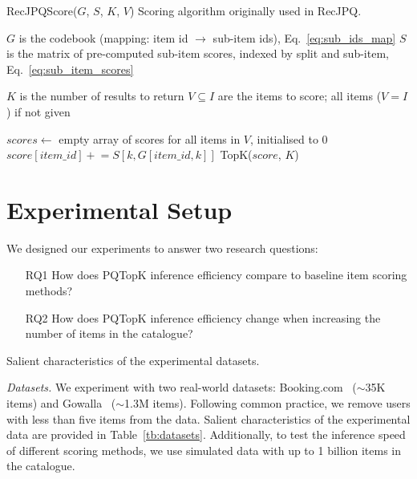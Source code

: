 \documentclass[sigconf,natbib=true, review=False]{acmart} %
\newcommand{\pluseq}{\mathrel{+}=}
\newcommand{\scrc}[1]{\textcolor[HTML]{000000}{#1}}
\begin{document}
\begin{algorithm}[h]
\small
\caption{RecJPQScore($G$, $S$, $K$, $V$) Scoring algorithm \scrc{originally} used in RecJPQ.}\label{alg:RecJPQtop_k}
\begin{algorithmic}[1]
   \Require $G$ is the codebook (mapping: item id $\rightarrow$ sub-item ids), Eq.~\eqref{eq:sub_ids_map}
   \Require $S$ is the matrix of pre-computed sub-item scores, indexed by split and sub-item, Eq.~\eqref{eq:sub_item_scores}

    

   \Require $K$ is the number of results to return
   \Require $V \subseteq I$ are the items to score; all items ($V = I$)  if not given 
   
   \State $scores \gets$ empty array of scores for all items in $V$, initialised to 0
    
            \State $score[item\_id]  \pluseq S[k,G[item\_id,k]] $ 
        \EndFor
   \EndFor
   \State \Return TopK($score$, $K$) 
\end{algorithmic}
\end{algorithm}

\FloatBarrier
\vspace{-0.5\baselineskip}
\section{Experimental Setup}\label{sec:expsetup}
We designed our experiments to answer two research questions: 
\begin{itemize}
    \item[RQ1] How does PQTopK inference efficiency compare to baseline item scoring methods? 
    \item[RQ2] How does PQTopK inference efficiency change when increasing the number of items in the catalogue? 
\end{itemize}

\begin{table}[t]
\caption{Salient characteristics of the experimental datasets.} \label{tb:datasets}
    \resizebox{\linewidth}{!}{
      
}
\end{table}




\textit{Datasets.} We experiment with two real-world datasets: Booking.com~\cite{goldenberg_bookingcom_2021}  ($\sim$35K items) and Gowalla~\cite{choFriendshipMobilityUser2011} ($\sim$1.3M items). Following common practice, we remove users with less than five items from the data. Salient characteristics of the experimental data are provided in Table~\ref{tb:datasets}. Additionally, to test the inference speed of different scoring methods, we use simulated data with up to 1 billion items in the catalogue. 
\end{document}
